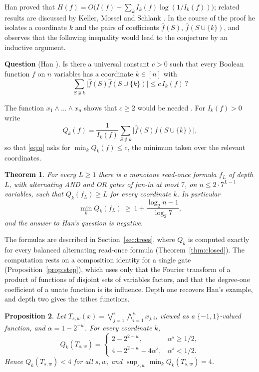 \documentclass[11pt]{amsart}
\newtheorem{theorem}{Theorem}[section]
\newtheorem{proposition}[theorem]{Proposition}
\theoremstyle{definition}\newtheorem{definition}[theorem]{Definition}
\theoremstyle{remark}\newtheorem{remark}[theorem]{Remark}
\newcommand{\hf}{\widehat{f}}
\begin{document}
Han \cite{han} proved that $H(f)=O\bigl(I(f)+\sum_k I_k(f)\log(1/I_k(f))\bigr)$; related results are discussed by
Keller, Mossel and Schlank \cite{kms}. In the course of the proof he isolates
a coordinate $k$ and the pairs of coefficients $\hf(S)$, $\hf(S\cup\{k\})$, and observes that the following inequality
would lead to the conjecture by an inductive argument.

\medskip
\noindent\textbf{Question} (Han \cite[Question~3.1]{han}). Is there a universal constant $c>0$ such that every
Boolean function $f$ on $n$ variables has a coordinate $k\in[n]$ with
\begin{equation}\label{eq:q}
\sum_{S\not\ni k}\bigl|\hf(S)\hf(S\cup\{k\})\bigr|\le c\,I_k(f)\,?
\end{equation}
\medskip

The function $x_1\wedge\dots\wedge x_n$ shows that $c\ge 2$ would be needed \cite{han}. For $I_k(f)>0$ write
\[
Q_k(f)=\frac{1}{I_k(f)}\sum_{S\not\ni k}\bigl|\hf(S)\hf(S\cup\{k\})\bigr| ,
\]
so that \eqref{eq:q} asks for $\min_k Q_k(f)\le c$, the minimum taken over the relevant coordinates.

\begin{theorem}\label{thm:main}
For every $L\ge1$ there is a monotone read-once formula $f_L$ of depth $L$, with alternating AND and OR gates of
fan-in at most $7$, on $n\le 2\cdot7^{L-1}$ variables, such that $Q_k(f_L)\ge L$ for every coordinate $k$. In
particular
\[
\min_k Q_k(f_L)\ \ge\ 1+\frac{\log_2 n-1}{\log_2 7},
\]
and the answer to Han's question is negative.
\end{theorem}

The formulas are described in Section~\ref{sec:trees}, where $Q_k$ is computed exactly for every balanced
alternating read-once formula (Theorem~\ref{thm:closed}). The computation rests on a composition identity for a
single gate (Proposition~\ref{prop:step}), which uses only that the Fourier transform of a product of functions of
disjoint sets of variables factors, and that the degree-one coefficient of a unate function is its influence.
Depth one recovers Han's example, and depth two gives the tribes functions.

\begin{proposition}\label{prop:tribes}
Let $T_{s,w}(x)=\bigvee_{j=1}^s\bigwedge_{i=1}^w x_{j,i}$, viewed as a $\{-1,1\}$-valued function, and
$\alpha=1-2^{-w}$. For every coordinate $k$,
\[
Q_k(T_{s,w})=\begin{cases}2-2^{2-w}, & \alpha^s\ge 1/2,\\ 4-2^{2-w}-4\alpha^s, & \alpha^s<1/2.\end{cases}
\]
Hence $Q_k(T_{s,w})<4$ for all $s,w$, and $\sup_{s,w}\min_kQ_k(T_{s,w})=4$.
\end{proposition}
\end{document}
